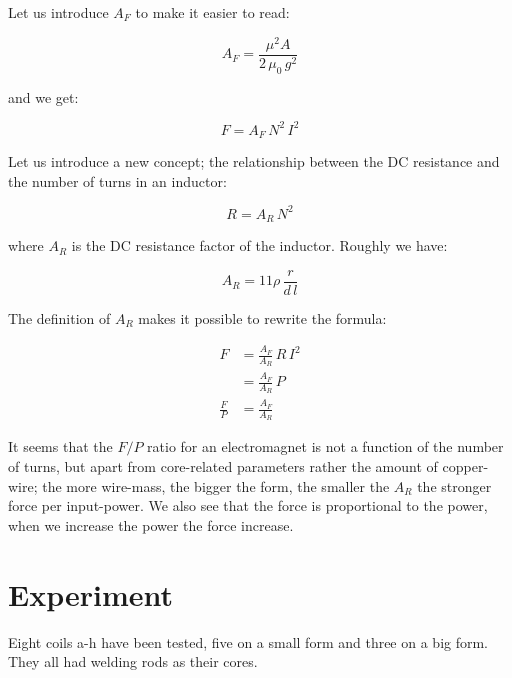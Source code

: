 \documentclass[]{../common/elementary-physics}
\begin{document}


Let us introduce $A_F$ to make it easier to read:

\begin{equation}
A_F = \frac{\mu^2 A}{2 \, \mu_0 \, g^2}
\end{equation}

and we get:

\begin{equation}
F = A_F \, N^2 \, I^2
\end{equation}

Let us introduce a new concept; the relationship between the DC resistance and the number of turns in an inductor:

\begin{equation}
R = A_R \, N^2
\end{equation}

where $A_R$ is the DC resistance factor of the inductor.
Roughly we have:

\begin{equation}
A_R = 11 \rho \, \frac{r}{d \, l}
\end{equation}

The definition of $A_R$ makes it possible to rewrite the formula:

\begin{subequations}
\begin{align}
F &= \frac{A_F}{A_R} \, R \, I^2 \\
&= \frac{A_F}{A_R} \, P \\
\frac{F}{P} &= \frac{A_F}{A_R}
\end{align}
\end{subequations}

It seems that the $F/P$ ratio for an electromagnet is not a function of the number of turns, but apart from core-related parameters rather the amount of copper-wire; the more wire-mass, the bigger the form, the smaller the $A_R$ the stronger force per input-power. We also see that the force is proportional to the power, when we increase the power the force increase.

\pagebreak

\section{Experiment}

Eight coils a-h have been tested, five on a small form and three on a big form.
They all had welding rods as their cores.
\end{document}
